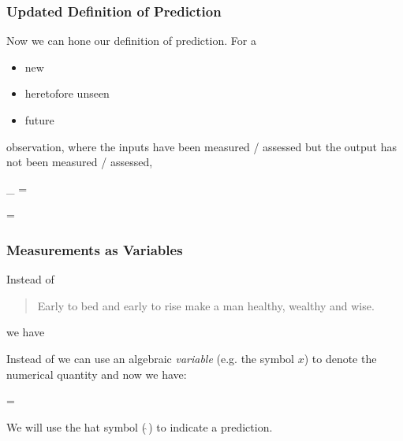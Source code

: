 \documentclass[slides]{beamer} %
\begin{document}
\begin{frame}\frametitle{Updated Definition of Prediction}

\small 
Now we can hone our definition of prediction. For a 

\begin{itemize}
\item new 
\item heretofore unseen 
\item future
\end{itemize}

observation, where the inputs have been measured / assessed but the output has not been measured / assessed,

\beqn
{}_{} = 
\eeqn

\tiny 
\beqn
{} = 
\eeqn
\normalsize


\end{frame}


\begin{frame}\frametitle{Measurements as Variables}

Instead of 

\begin{quotation}
Early to bed and early to rise make a man healthy, wealthy and wise.
\end{quotation}

we have



Instead of  we can use an algebraic \textit{variable} (e.g. the symbol $x$) to denote the numerical quantity and now we have:

 \beqn
{} = 
\eeqn

We will use the hat symbol ($\hat{~}$) to indicate a prediction. 
\end{frame}
\end{document}
